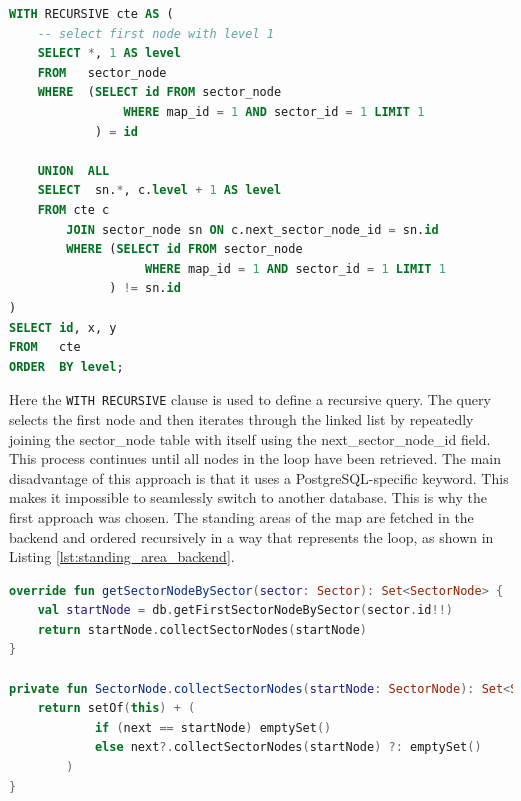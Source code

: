 \newpage

\begin{lstlisting}[language=SQL, caption=Recursive Query, label=lst:recursive_query]
WITH RECURSIVE cte AS (
    -- select first node with level 1
    SELECT *, 1 AS level
    FROM   sector_node
    WHERE  (SELECT id FROM sector_node 
                WHERE map_id = 1 AND sector_id = 1 LIMIT 1
            ) = id

    UNION  ALL
    SELECT  sn.*, c.level + 1 AS level
    FROM cte c
        JOIN sector_node sn ON c.next_sector_node_id = sn.id 
        WHERE (SELECT id FROM sector_node 
                   WHERE map_id = 1 AND sector_id = 1 LIMIT 1
              ) != sn.id
)
SELECT id, x, y
FROM   cte
ORDER  BY level;
\end{lstlisting}

Here the \texttt{WITH RECURSIVE} clause is used to define a recursive query. The query selects the first node and then iterates through the linked list by repeatedly joining the sector\_node table with itself using the next\_sector\_node\_id field. This process continues until all nodes in the loop have been retrieved. The main disadvantage of this approach is that it uses a PostgreSQL-specific keyword. This makes it impossible to seamlessly switch to another database. This is why the first approach was chosen. The standing areas of the map are fetched in the backend and ordered recursively in a way that represents the loop, as shown in Listing \ref{lst:standing_area_backend}.

\begin{lstlisting}[language=Kotlin, caption=Standing Area Backend, label=lst:standing_area_backend]
override fun getSectorNodeBySector(sector: Sector): Set<SectorNode> {
    val startNode = db.getFirstSectorNodeBySector(sector.id!!)
    return startNode.collectSectorNodes(startNode)
}

private fun SectorNode.collectSectorNodes(startNode: SectorNode): Set<SectorNode> {
    return setOf(this) + (
            if (next == startNode) emptySet() 
            else next?.collectSectorNodes(startNode) ?: emptySet()
        )
}
\end{lstlisting}